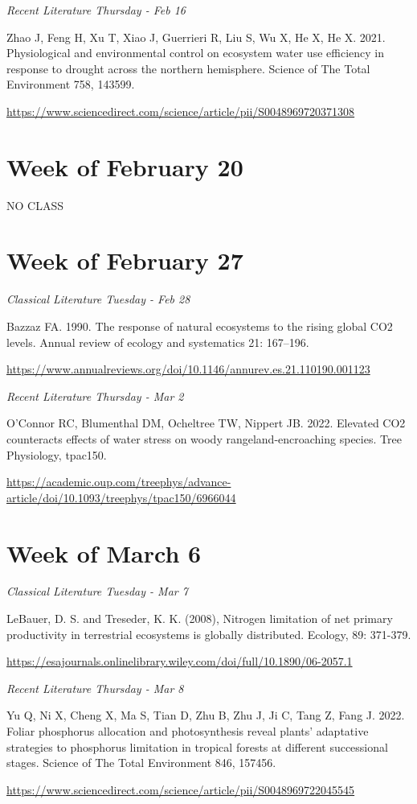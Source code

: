 \documentclass[12pt, notitlepage]{article}   	%
\begin{document}
{\textit{Recent Literature Thursday - Feb 16} \par
Zhao J, Feng H, Xu T, Xiao J, Guerrieri R, Liu S, Wu X, He X, He X. 2021. 
Physiological and environmental control on ecosystem water use efficiency 
in response to drought across the northern hemisphere. Science of The Total Environment 758, 143599. \par
\url{https://www.sciencedirect.com/science/article/pii/S0048969720371308}

\section*{Week of February 20}
NO CLASS

\section*{Week of February 27}
\textit{Classical Literature Tuesday - Feb 28} \par
Bazzaz FA. 1990. The response of natural ecosystems to the rising global CO2 levels. 
Annual review of ecology and systematics 21: 167–196. \par
\url{https://www.annualreviews.org/doi/10.1146/annurev.es.21.110190.001123}

\textit{Recent Literature Thursday - Mar 2} \par
O’Connor RC, Blumenthal DM, Ocheltree TW, Nippert JB. 2022. Elevated CO2 counteracts 
effects of water stress on woody rangeland-encroaching species. Tree Physiology, tpac150. \par
\url{https://academic.oup.com/treephys/advance-article/doi/10.1093/treephys/tpac150/6966044}

\section*{Week of March 6}
\textit{Classical Literature Tuesday - Mar 7} \par
LeBauer, D. S. and Treseder, K. K. (2008), Nitrogen limitation of net primary productivity
in terrestrial ecosystems is globally distributed. Ecology, 89: 371-379. \par
\url{https://esajournals.onlinelibrary.wiley.com/doi/full/10.1890/06-2057.1}

\textit{Recent Literature Thursday - Mar 8} \par
Yu Q, Ni X, Cheng X, Ma S, Tian D, Zhu B, Zhu J, Ji C, Tang Z, Fang J. 2022. 
Foliar phosphorus allocation and photosynthesis reveal plants’ adaptative strategies 
to phosphorus limitation in tropical forests at different successional stages. 
Science of The Total Environment 846, 157456. \par
\url{https://www.sciencedirect.com/science/article/pii/S0048969722045545}

}
\end{document}
